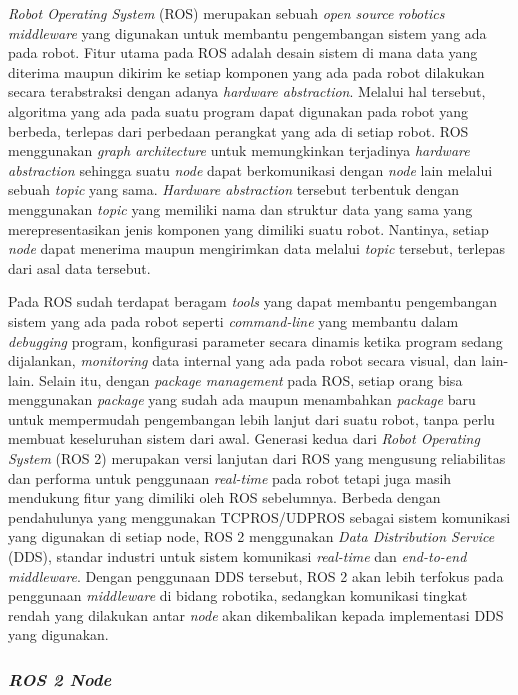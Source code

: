 \textit{Robot Operating System} (ROS) \parencite{quigley} merupakan sebuah \textit{open source} \textit{robotics middleware} yang digunakan untuk membantu pengembangan sistem yang ada pada robot. Fitur utama
pada ROS adalah desain sistem di mana data yang diterima maupun dikirim ke setiap komponen yang ada pada robot dilakukan secara terabstraksi dengan adanya \textit{hardware abstraction}. Melalui hal tersebut, algoritma yang ada pada suatu program
dapat digunakan pada robot yang berbeda, terlepas dari perbedaan perangkat yang ada di setiap robot.
ROS menggunakan \textit{graph architecture} untuk memungkinkan terjadinya \textit{hardware abstraction} sehingga suatu \textit{node} dapat berkomunikasi dengan \textit{node} lain melalui sebuah \textit{topic} yang sama.
\textit{Hardware abstraction} tersebut terbentuk dengan menggunakan \textit{topic} yang memiliki nama dan struktur data yang sama yang merepresentasikan jenis komponen yang dimiliki suatu robot.
Nantinya, setiap \textit{node} dapat menerima maupun mengirimkan data melalui \textit{topic} tersebut, terlepas dari asal data tersebut.

Pada ROS sudah terdapat beragam \textit{tools} yang dapat membantu pengembangan sistem yang ada pada robot seperti \textit{command-line} yang membantu dalam \textit{debugging} program,
konfigurasi parameter secara dinamis ketika program sedang dijalankan, \textit{monitoring} data internal yang ada pada robot secara visual,
dan lain-lain. Selain itu, dengan \textit{package management} pada ROS, setiap orang bisa menggunakan \textit{package} yang sudah
ada maupun menambahkan \textit{package} baru untuk mempermudah pengembangan lebih lanjut dari suatu robot, tanpa perlu membuat keseluruhan sistem dari awal.
Generasi kedua dari \textit{Robot Operating System} (ROS 2) merupakan versi lanjutan dari ROS yang mengusung reliabilitas dan performa untuk penggunaan \textit{real-time} pada robot tetapi juga masih mendukung fitur yang dimiliki oleh ROS sebelumnya. Berbeda dengan
pendahulunya yang menggunakan TCPROS/UDPROS sebagai sistem komunikasi yang digunakan di setiap node, ROS 2 menggunakan \textit{Data Distribution Service} (DDS), standar industri
untuk sistem komunikasi \textit{real-time} dan \textit{end-to-end middleware}. Dengan penggunaan DDS tersebut, ROS 2 akan lebih terfokus pada
penggunaan \textit{middleware} di bidang robotika, sedangkan komunikasi tingkat rendah yang dilakukan antar \textit{node} akan dikembalikan kepada implementasi DDS yang digunakan.

\subsubsection{\textit{ROS 2 Node}}
\label{subsubsec:ros2node}

